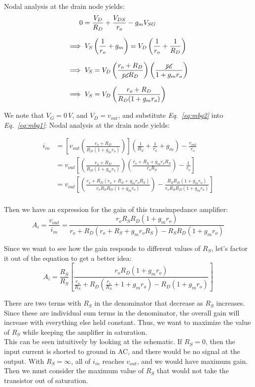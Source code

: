 \documentclass[12pt, fleqn]{article}
\begin{document}
\begin{enumerate}[label=(\alph*)]
{    Nodal analysis at the drain node yields: 
    \begin{align}
        0 &= \frac{V_D}{R_D} + \frac{V_{DS}}{r_o} - g_m V_{SG}\\[0.25cm]
        \implies &\; V_S\left(\frac{1}{r_o} + g_m\right) = V_D\left(\frac{1}{r_o} + \frac{1}{R_D}\right)\\[0.25cm]
        \implies &\; V_S = V_D \left(\frac{r_o + R_D}{\cancel{r_o} R_D}\right)\left(\frac{\cancel{r_o}}{1 + g_m r_o}\right)\\[0.25cm]
        \implies &\; V_S = V_D \left(\frac{r_o + R_D}{R_D(1 + g_m r_o)}\right)
        \label{eq:mbg2}
    \end{align}
    }
    
\newpage
    We note that $V_G = 0\,V$, and $V_D = v_{out}$, and substitute \textit{Eq.~\ref{eq:mbg2}} into \textit{Eq.~\ref{eq:mbg1}}:
    Nodal analysis at the drain node yields:
    
    \begin{align*}
        i_{in} &= \left[v_{out} \left(\frac{r_o + R_D}{R_D(1 + g_m r_o)}\right)\right]\left(\frac{1}{R_S} + \frac{1}{r_o} + g_m\right) - \frac{v_{out}}{r_o}\\[0.25cm]
        &= v_{out} \left[\left(\frac{r_o + R_D}{R_D(1 + g_m r_o)}\right)\left(\frac{r_o + R_S + g_m r_o R_S}{r_o R_S}\right) - \frac{1}{r_o}\right]\\[0.25cm]
        &= v_{out} \left[\left(\frac{r_o + R_D(r_o + R_S + g_m r_o R_S)}{r_o R_S R_D(1 + g_m r_o)}\right) - \frac{R_S R_D(1 + g_m r_o)}{r_o R_S R_D (1 + g_m r_o)}\right]\\[0.25cm]
    \end{align*}

    Then we have an expression for the gain of this transimpedance amplifier:
    \begin{equation}
        \boxed{A_i = \frac{v_{out}}{i_{in}} = \frac{r_o R_S R_D (1 + g_m r_o)}{r_o + R_D(r_o + R_S + g_m r_o R_S) - R_S R_D(1 + g_m r_o)}}
    \end{equation}
    
    Since we want to see how the gain responds to different values of $R_S$, let's factor it out of the equation to get a better idea:
    \begin{equation}
        A_i = \frac{R_S}{R_S}\left[\frac{r_o R_D (1 + g_m r_o)}{\frac{r_o}{R_S} + R_D(\frac{r_o}{R_S} + 1 + g_m r_o) - R_D(1 + g_m r_o)}\right]
    \end{equation}
    
    There are two terms with $R_S$ in the denominator that decrease as $R_S$ increases.  Since these are individual sum terms in the denominator, the overall gain will increase with everything else held constant.  Thus, we want to maximize the value of $R_S$ while keeping the amplifier in saturation.\\[0.5cm]
    This can be seen intuitively by looking at the schematic.  If $R_S = 0$, then the input current is shorted to ground in AC, and there would be no signal at the output.  With $R_S = \infty$, all of $i_{in}$ reaches $v_{out}$, and we would have maximum gain.  Then we must consider the maximum value of $R_S$ that would not take the transistor out of saturation.


\end{enumerate}
\end{document}
